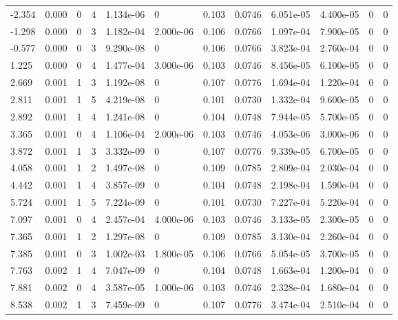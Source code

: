 \documentclass[preview]{standalone}
\begin{document}
{{\begin{tabular}{L{1.2cm}C{1.2cm} C{0.3cm}C{0.5cm} C{1.4cm}C{1.4cm} C{1.4cm}C{1.4cm} C{1.6cm}C{1.6cm} C{1.6cm}C{1.6cm}}
  -2.354  &  0.000  & 0     &  4 &  1.134e-06  & 0  &  0.103&   0.0746& 6.051e-05 & 4.400e-05   &  0 & 0  \\ 
  -1.298  &  0.000  & 0     &  3 &  1.182e-04  & 2.000e-06  &  0.106&   0.0766& 1.097e-04 & 7.900e-05   &  0 & 0  \\ 
  -0.577  &  0.000  & 0     &  3 &  9.290e-08  & 0  &  0.106&   0.0766& 3.823e-04 & 2.760e-04   &  0 & 0  \\ 
  1.225  &  0.000  & 0     &  4 &  1.477e-04  & 3.000e-06  &  0.103&   0.0746& 8.456e-05 & 6.100e-05   &  0 & 0  \\ 
  2.669  &  0.001  & 1     &  3 &  1.192e-08  & 0  &  0.107&   0.0776& 1.694e-04 & 1.220e-04   &  0 & 0  \\ 
  2.811  &  0.001  & 1     &  5 &  4.219e-08  & 0  &  0.101&   0.0730& 1.332e-04 & 9.600e-05   &  0 & 0  \\ 
  2.892  &  0.001  & 1     &  4 &  1.241e-08  & 0  &  0.104&   0.0748& 7.944e-05 & 5.700e-05   &  0 & 0  \\ 
  3.365  &  0.001  & 0     &  4 &  1.106e-04  & 2.000e-06  &  0.103&   0.0746& 4.053e-06 & 3.000e-06   &  0 & 0  \\ 
  3.872  &  0.001  & 1     &  3 &  3.332e-09  & 0  &  0.107&   0.0776& 9.339e-05 & 6.700e-05   &  0 & 0  \\ 
  4.058  &  0.001  & 1     &  2 &  1.497e-08  & 0  &  0.109&   0.0785& 2.809e-04 & 2.030e-04   &  0 & 0  \\ 
  4.442  &  0.001  & 1     &  4 &  3.857e-09  & 0  &  0.104&   0.0748& 2.198e-04 & 1.590e-04   &  0 & 0  \\ 
  5.724  &  0.001  & 1     &  5 &  7.224e-09  & 0  &  0.101&   0.0730& 7.227e-04 & 5.220e-04   &  0 & 0  \\ 
  7.097  &  0.001  & 0     &  4 &  2.457e-04  & 4.000e-06  &  0.103&   0.0746& 3.133e-05 & 2.300e-05   &  0 & 0  \\ 
  7.365  &  0.001  & 1     &  2 &  1.297e-08  & 0  &  0.109&   0.0785& 3.130e-04 & 2.260e-04   &  0 & 0  \\ 
  7.385  &  0.001  & 0     &  3 &  1.002e-03  & 1.800e-05  &  0.106&   0.0766& 5.054e-05 & 3.700e-05   &  0 & 0  \\ 
  7.763  &  0.002  & 1     &  4 &  7.047e-09  & 0  &  0.104&   0.0748& 1.663e-04 & 1.200e-04   &  0 & 0  \\ 
  7.881  &  0.002  & 0     &  4 &  3.587e-05  & 1.000e-06  &  0.103&   0.0746& 2.328e-04 & 1.680e-04   &  0 & 0  \\ 
  8.538  &  0.002  & 1     &  3 &  7.459e-09  & 0  &  0.107&   0.0776& 3.474e-04 & 2.510e-04   &  0 & 0  \\ 

\end{tabular}}}
\end{document}
